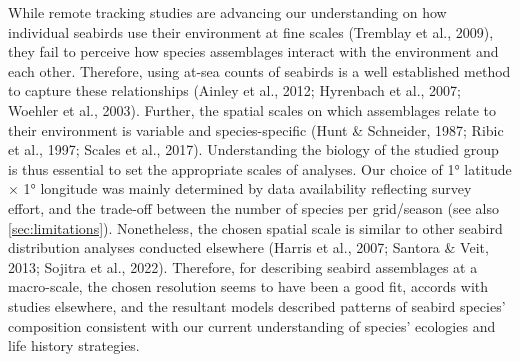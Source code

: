 \documentclass{article}
\begin{document}
\begin{linenumbers}
While remote tracking studies are advancing our understanding on how individual seabirds use their environment at fine scales (Tremblay et al., 2009), they fail to perceive how species assemblages interact with the environment and each other. Therefore, using at-sea counts of seabirds is a well established method to capture these relationships (Ainley et al., 2012; Hyrenbach et al., 2007; Woehler et al., 2003). Further, the spatial scales on which assemblages relate to their environment is variable and species-specific (Hunt \& Schneider, 1987; Ribic et al., 1997; Scales et al., 2017). Understanding the biology of the studied group is thus essential to set the appropriate scales of analyses. Our choice of 1° latitude \(\times\) 1° longitude was mainly determined by data availability reflecting survey effort, and the trade-off between the number of species per grid/season (see also \ref{sec:limitations}). Nonetheless, the chosen spatial scale is similar to other seabird distribution analyses conducted elsewhere (Harris et al., 2007; Santora \& Veit, 2013; Sojitra et al., 2022). Therefore, for describing seabird assemblages at a macro-scale, the chosen resolution seems to have been a good fit, accords with studies elsewhere, and the resultant models described patterns of seabird species' composition consistent with our current understanding of species' ecologies and life history strategies.


\end{linenumbers}
\end{document}
